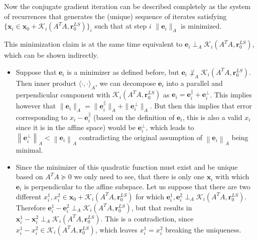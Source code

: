 \documentclass{article}
\newcommand{\mbf}[1]{\mathbf{#1}}
\begin{document}
	Now the conjugate gradient iteration can be described completely as the system of recurrences that generates the (unique) sequence of iterates satisfying $\{\mbf{x}_i\in \mathbf{x}_0 + \mathcal{K}_i(A^TA,\mathbf{r}_0^{LS})\}_i$ such that at step $i$ $\|\mbf{e}_i\|_A$ is minimized. %
	
	This minimization claim is at the same time equivalent to $\textbf{e}_i \perp_{A} \mathcal{K}_i\left(A^T A, \textbf{r}_0^{LS} \right)$, which can be shown indirectly.
	\begin{itemize}
		\item Suppose that $\textbf{e}_i$ is a minimizer as defined before, but $\textbf{e}_i \not\perp_{A} \mathcal{K}_i\left(A^T A, \textbf{r}_0^{LS} \right)$. Then inner product $\langle\cdot,\cdot\rangle_{A}$, we can decompose $\textbf{e}_i$ into a parallel and perpendicular component with $\mathcal{K}_i\left(A^T A, \textbf{r}_0^{LS} \right)$ as $\textbf{e}_i = \textbf{e}_i^\parallel + \textbf{e}_i^\perp$. This implies however that $\|\textbf{e}_i\|_A = \|\textbf{e}_i^\parallel\|_A + \|\textbf{e}_i^\perp \|_A$. But then this implies that error corresponding to $x_i-\textbf{e}_i^\parallel$ (based on the definition of $\textbf{e}_i$, this is also a valid $x_i$ since it is in the affine space) would be $\textbf{e}_i^\perp$, which leads to $\left\|\textbf{e}_i^\perp \right\|_A < \left\|\textbf{e}_i \right\|_A$ contradicting the original assumption of $\left\|\textbf{e}_i \right\|_A$ being minimal.
		\item Since the minimizer of this quadratic function must exist and be unique based on $A^T A \succeq 0$ we only need to see, that there is only one $\textbf{x}_i$ with which $\textbf{e}_i$ is perpendicular to the affine subspace. Let us suppose that there are two different $x_i^1, x_i^2 \in \mathbf{x}_0 + \mathcal{K}_i(A^TA,\mathbf{r}_0^{LS})$  for which $\textbf{e}_i^1,\textbf{e}_i^2 \perp_{A} \mathcal{K}_i\left(A^T A, \textbf{r}_0^{LS} \right)$. Therefore $\textbf{e}_i^1 - \textbf{e}_i^2 \perp_{A} \mathcal{K}_i\left(A^T A, \textbf{r}_0^{LS} \right)$, but that results in $\textbf{x}_i^1 - \textbf{x}_i^2 \perp_{A} \mathcal{K}_i\left(A^T A, \textbf{r}_0^{LS} \right)$. This is a contradiction, since $x_i^1-x_i^2 \in  \mathcal{K}_i(A^TA,\mathbf{r}_0^{LS})$, which leaves  $x_i^1=x_i^2$ breaking the uniqueness.
	\end{itemize}
\end{document}
